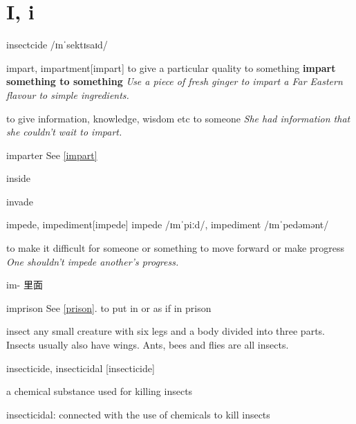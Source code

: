 \section{I, i}

\begin{DefWord}{insectcide}
    /ɪnˈsektɪsaɪd/
\end{DefWord}

\begin{DefWord}{impart, impartment}[impart]
    to give a particular quality to something
    \textbf{impart something to something}
    \textit{Use a piece of fresh ginger to impart a Far Eastern flavour to simple ingredients.}

    to give information, knowledge, wisdom etc to someone
    \textit{She had information that she couldn't wait to impart.}
\end{DefWord}

\begin{DefWord}{imparter}
    See \ref{impart}
\end{DefWord}

\begin{DefWord}{inside}
\end{DefWord}

\begin{DefWord}{invade}
\end{DefWord}

\begin{DefWord}{impede, impediment}[impede]
    impede /ɪmˈpiːd/,  impediment /ɪmˈpedəmənt/ 

    to make it difficult for someone or something to move forward or make progress
    \textit{One shouldn't impede another's progress.}

    im- 里面
\end{DefWord}

\begin{DefWord}{imprison}
    See \ref{prison}.
    to put in or as if in prison
\end{DefWord}

\begin{DefWord}{insect}
    any small creature with six legs and a body divided into three parts. Insects usually also have wings. Ants, bees and flies are all insects.
\end{DefWord}

\begin{DefWord}{insecticide,  insecticidal }[insecticide]

    a chemical substance used for killing insects

    insecticidal: connected with the use of chemicals to kill insects 
\end{DefWord}


